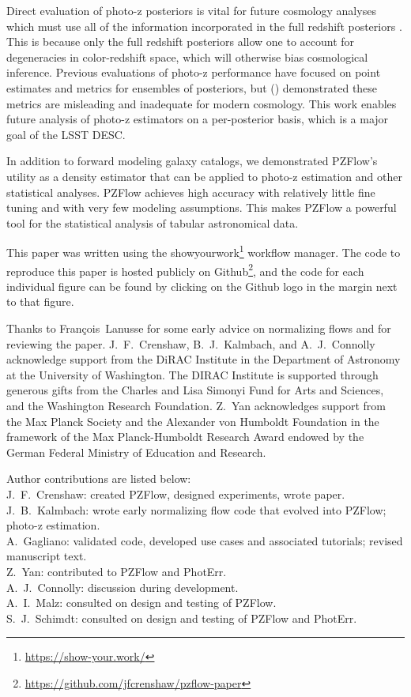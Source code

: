 \documentclass[twocolumn,twocolappendix]{aastex631}
\newcommand{\citePZt}{\citetalias{schmidt2020} (\citeyear{schmidt2020})\xspace}
\begin{document}
Direct evaluation of photo-z posteriors is vital for future cosmology analyses which must use all of the information incorporated in the full redshift posteriors \citep{newman2022}.
This is because only the full redshift posteriors allow one to account for degeneracies in color-redshift space, which will otherwise bias cosmological inference.
Previous evaluations of photo-z performance have focused on point estimates and metrics for ensembles of posteriors, but \citePZt demonstrated these metrics are misleading and inadequate for modern cosmology.
This work enables future analysis of photo-z estimators on a per-posterior basis, which is a major goal of the LSST DESC.

In addition to forward modeling galaxy catalogs, we demonstrated PZFlow's utility as a density estimator that can be applied to photo-z estimation and other statistical analyses.
PZFlow achieves high accuracy with relatively little fine tuning and with very few modeling assumptions.
This makes PZFlow a powerful tool for the statistical analysis of tabular astronomical data.

This paper was written using the showyourwork\footnote{\url{https://show-your.work/}} workflow manager.
The code to reproduce this paper is hosted publicly on Github\footnote{\url{https://github.com/jfcrenshaw/pzflow-paper}}, and the code for each individual figure can be found by clicking on the Github logo in the margin next to that figure.

\begin{acknowledgements}
    Thanks to François~Lanusse for some early advice on normalizing flows and for reviewing the paper.
    J.~F.~Crenshaw, B.~J.~Kalmbach, and A.~J.~Connolly acknowledge support from the DiRAC Institute in the Department of Astronomy at the University of Washington.
    The DIRAC Institute is supported through generous gifts from the Charles and Lisa Simonyi Fund for Arts and Sciences, and the Washington Research Foundation.
    Z.~Yan acknowledges support from the Max Planck Society and the Alexander von Humboldt Foundation in the framework of the Max Planck-Humboldt Research Award endowed by the German Federal Ministry of Education and Research.

    Author contributions are listed below: \\
    J.~F.~Crenshaw: created PZFlow, designed experiments, wrote paper. \\
    J.~B.~Kalmbach: wrote early normalizing flow code that evolved into PZFlow; photo-z estimation. \\
    A.~Gagliano: validated code, developed use cases and associated tutorials; revised manuscript text. \\
    Z.~Yan: contributed to PZFlow and PhotErr. \\
    A.~J.~Connolly: discussion during development. \\
    A.~I.~Malz: consulted on design and testing of PZFlow. \\
    S.~J.~Schimdt: consulted on design and testing of PZFlow and PhotErr. \\
\end{acknowledgements}
\end{document}
